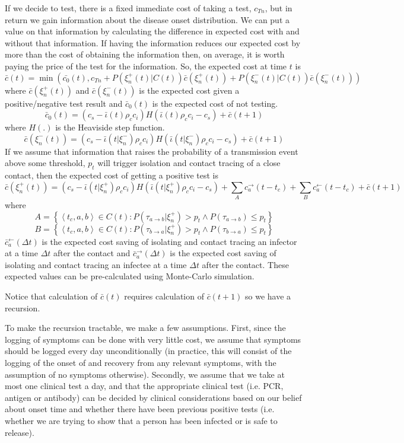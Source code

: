 \documentclass{article}
\begin{document}
If we decide to test, there is a fixed immediate cost of taking a test, $c_{Tn}$, but in return we gain information about the disease onset distribution. We can put a value on that information by calculating the difference in expected cost with and without that information. If having the information reduces our expected cost by more than the cost of obtaining the information then, on average, it is worth paying the price of the test for the information. So, the expected cost at time $t$ is
\[
\bar{c}(t) = \min(\bar{c_0}(t), c_{Tn} + P(\xi_n^+(t)|C(t))\bar{c}(\xi_n^+(t)) + P(\xi_n^-(t)|C(t))\bar{c}(\xi_n^-(t)))
\]
where $\bar{c}(\xi_n^+(t))$ and $\bar{c}(\xi_n^-(t))$ is the expected cost given a positive/negative test result and $\bar{c}_0(t)$ is the expected cost of not testing.
\[
\bar{c}_0(t) = (c_s - \bar{\iota}(t)\rho_cc_i)H(\bar{\iota}(t)\rho_cc_i - c_s) + \bar{c}(t+1)
\]
where $H(.)$ is the Heaviside step function.
\[
\bar{c}(\xi_n^-(t)) = (c_s - \bar{\iota}(t|\xi_n^-)\rho_cc_i)H(\bar{\iota}(t|\xi_n^-)\rho_cc_i - c_s) + \bar{c}(t+1)
\]
If we assume that information that raises the probability of a transmission event above some threshold, $p_t$ will trigger isolation and contact tracing of a close contact, then the expected cost of getting a positive test is
\[
\bar{c}(\xi_n^+(t)) = 
  (c_s - \bar{\iota}(t|\xi_n^+)\rho_cc_i)H(\bar{\iota}(t|\xi_n^+)\rho_cc_i - c_s) + 
  \sum_{A} c_a^\rightarrow(t-t_c) 
+   \sum_{B} c_a^\leftarrow(t-t_c) 
+ \bar{c}(t+1)
\]
where 
\[
A = \left\{
    \left<t_c,a,b\right> \in C(t): P(\tau_{a\rightarrow b}|\xi_n^+) > p_{t} \wedge P(\tau_{a\rightarrow b}) \le p_{t}
  \right\}
\]
\[
B = \left\{
    \left<t_c,a,b\right> \in C(t): P(\tau_{b\rightarrow a}|\xi_n^+) > p_{t} \wedge P(\tau_{b\rightarrow a}) \le p_{t}
  \right\}
\]
$\bar{c}_a^\leftarrow(\Delta t)$ is the expected cost saving of isolating and contact tracing an infector at a time $\Delta t$ after the contact and $\bar{c}_a^\rightarrow(\Delta t)$ is the expected cost saving of isolating and contact tracing an infectee at a time $\Delta t$ after the contact. These expected values can be pre-calculated using Monte-Carlo simulation. 


Notice that calculation of $\bar{c}(t)$ requires calculation of $\bar{c}(t+1)$ so we have a recursion.

To make the recursion tractable, we make a few assumptions. First, since the logging of symptoms can be done with very little cost, we assume that symptoms should be logged every day unconditionally (in practice, this will consist of the logging of the onset of and recovery from any relevant symptoms, with the assumption of no symptoms otherwise). Secondly, we assume that we take at most one clinical test a day, and that the appropriate clinical test (i.e. PCR, antigen or antibody) can be decided by clinical considerations based on our belief about onset time and whether there have been previous positive tests (i.e. whether we are trying to show that a person has been infected or is safe to release).
\end{document}
